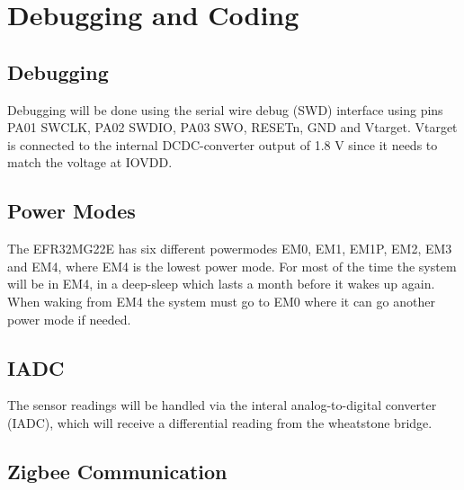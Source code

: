 \section{Debugging and Coding}

\subsection{Debugging}
Debugging will be done using the serial wire debug (SWD) interface using pins PA01 SWCLK, PA02 SWDIO, PA03 SWO, RESETn, GND and Vtarget. Vtarget is connected to the internal DCDC-converter output of 1.8 V since it needs to match the voltage at IOVDD. 

\subsection{Power Modes}
\label{Sec:Power_Modes}
The EFR32MG22E has six different powermodes EM0, EM1, EM1P, EM2, EM3 and EM4, where EM4 is the lowest power mode. For most of the time the system will be in EM4, in a deep-sleep which lasts a month before it wakes up again. When waking from EM4 the system must go to EM0 where it can go another power mode if needed.

\subsection{IADC}
The sensor readings will be handled via the interal analog-to-digital converter (IADC), which will receive a differential reading from the wheatstone bridge.

\subsection{Zigbee Communication}